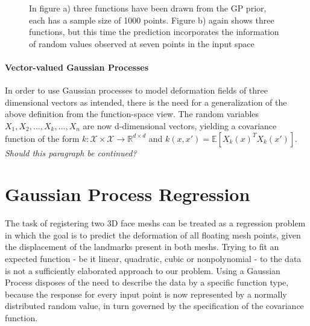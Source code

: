 \begin{figure}[h!]
\caption{In figure a) three functions have been drawn from the GP prior, each has a sample size of 1000 points. Figure b) again shows three functions, but this time the prediction incorporates the information of random values observed at seven points in the input space}
\label{fig:GPPlot}
\end{figure}

\paragraph{Vector-valued Gaussian Processes}
In order to use Gaussian processes to model deformation fields of three dimensional vectors as intended, there is the need for a generalization of the above definition from the function-space view. The random variables $X_{1}, X_{2}, \ldots, X_{k}, \ldots, X_{n}$ are now d-dimensional vectors, yielding a covariance function of the form $k: \mathcal{X} \times \mathcal{X} \rightarrow \mathbb{R}^{d \times d}$ and $k(x,x')=\mathbb{E}[X_{k}(x)^{T}X_{k}(x')]$. \textit{Should this paragraph be continued?}

\section{Gaussian Process Regression}
The task of registering two 3D face meshs can be treated as a regression problem in which the goal is to predict the deformation of all floating mesh points, given the displacement of the landmarks present in both meshs. Trying to fit an expected function - be it linear, quadratic, cubic or nonpolynomial - to the data is not a sufficiently elaborated approach to our problem. 
Using a Gaussian Process disposes of the need to describe the data by a specific function type, because the response for every input point is now represented by a normally distributed random value, in turn governed by the specification of the covariance function.

